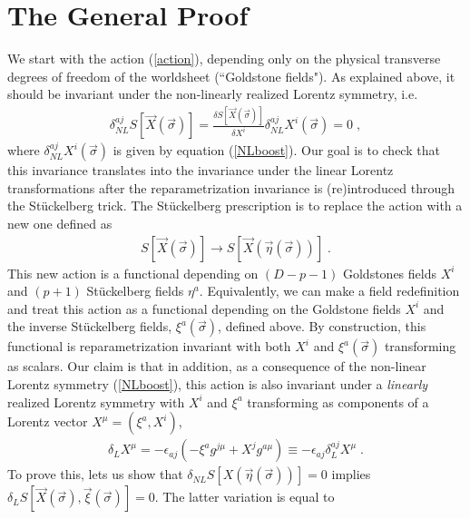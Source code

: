 \documentclass[%
 reprint,
 amsmath,amssymb,
 aps,
]{revtex4-1}
\begin{document}
\section{The General Proof}

We start with  the action (\ref{action}), depending
only on the physical transverse degrees of freedom of the worldsheet (``Goldstone fields").
As explained above, it should be invariant under the non-linearly realized Lorentz symmetry, i.e.
\begin{eqnarray}
    \delta^{a j}_{NL} S \left[ \vec{X}(\vec{\sigma}) \right]
    =
    \frac{\delta S[ \vec{X}(\vec{\sigma}) ]}{\delta X^i}
        \delta^{a j}_{NL} X^i(\vec{\sigma}) \nonumber = 0 \; , \nonumber
\end{eqnarray}
where $\delta^{aj}_{NL} X^i(\vec{\sigma})$ is given by equation (\ref{NLboost}).
Our goal is to check that this invariance translates into the invariance under the linear Lorentz transformations after the
reparametrization invariance is (re)introduced through the St\"uckelberg trick.
The  St\"uckelberg prescription is to replace the action with a new
one defined as
\begin{eqnarray}
    S[\vec{X}(\vec{\sigma})] \rightarrow S[\vec{X}(\vec{\eta}(\vec{\sigma}))] \; . \nonumber
\end{eqnarray}
This new action is a functional depending on $(D-p-1)$ Goldstones fields $X^i$ and $(p+1)$ St\"uckelberg fields $\eta^a$.
Equivalently, we can make a field redefinition and treat  this action as a functional depending on  the Goldstone fields $X^i$ and
the inverse St\"uckelberg fields, $\xi^a(\vec{\sigma})$, defined above. By construction, this functional is reparametrization invariant with
both $X^i$ and $\xi^a(\vec{\sigma})$ transforming as scalars.
 Our claim is that in addition, as a consequence of the non-linear Lorentz symmetry (\ref{NLboost}), this action is also invariant under a {\it linearly} realized
 Lorentz symmetry with $X^i$ and $\xi^a$ transforming as components of a Lorentz vector $X^\mu=(\xi^a, X^i)$,
\begin{eqnarray}
\label{linearvar}
    \delta_{L} X^{\mu} = -\epsilon_{a j} (-\xi^a g^{j \mu} + X^j g^{a \mu} ) \equiv -\epsilon_{a j} \delta^{a j}_L X^{\mu} \; .
\end{eqnarray}
To prove this, lets us  show  that
$\delta_{NL} S[X(\vec{\eta}(\vec{\sigma}))] = 0$ implies $\delta_{L} S[\vec{X}(\vec{\sigma}),\vec{\xi}(\vec{\sigma})] = 0$.
The latter variation is equal to
\end{document}
